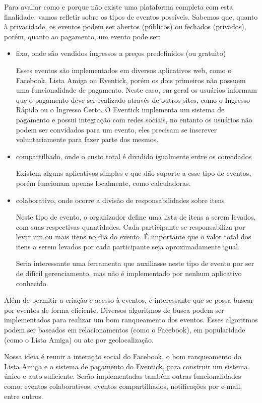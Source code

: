 Para avaliar como e porque não existe uma plataforma completa com esta finalidade, vamos refletir sobre os tipos de eventos possíveis. Sabemos que, quanto à privacidade, os eventos podem ser abertos (públicos) ou fechados (privados), porém, quanto ao pagamento, um evento pode ser:
\begin{itemize}
\item fixo, onde são vendidos ingressos a preços predefinidos (ou gratuito)

Esses eventos são implementados em diversos aplicativos web, como o Facebook, Lista Amiga ou Eventick, porém os dois primeiros não possuem uma funcionalidade de pagamento. Neste caso, em geral os usuários informam que o pagamento deve ser realizado através de outros sites, como o Ingresso Rápido ou o Ingresso Certo. O Eventick implementa um sistema de pagamento e possui integração com redes sociais, no entanto os usuários não podem ser convidados para um evento, eles precisam se inscrever voluntariamente para fazer parte dos mesmos.

\item compartilhado, onde o custo total é dividido igualmente entre os convidados

Existem alguns aplicativos simples e que dão suporte a esse tipo de eventos, porém funcionam apenas localmente, como calculadoras.

\item colaborativo, onde ocorre a divisão de responsabilidades sobre itens

Neste tipo de evento, o organizador define uma lista de itens a serem levados, com suas respectivas quantidades. Cada participante se responsabiliza por levar um ou mais itens no dia do evento. É importante que o valor total dos itens a serem levados por cada participante seja aproximadamente igual.

Seria interessante uma ferramenta que auxiliasse neste tipo de evento por ser de difícil gerenciamento, mas não é implementado por nenhum aplicativo conhecido.

\end{itemize}

Além de permitir a criação e acesso à eventos, é interessante que se possa buscar por eventos de forma eficiente. Diversos algoritmos de busca podem ser implementados para realizar um bom ranqueamento dos eventos. Esses algoritmos podem ser baseados em relacionamentos (como o Facebook), em popularidade (como o Lista Amiga) ou ate por geolocalização.

Nossa ideia é reunir a interação social do Facebook, o bom ranqueamento do Lista Amiga e o sistema de pagamento do Eventick, para construir um sistema único e auto suficiente. Serão implementadas também outras funcionalidades como: eventos colaborativos, eventos compartilhados, notificações por e-mail, entre outros.

